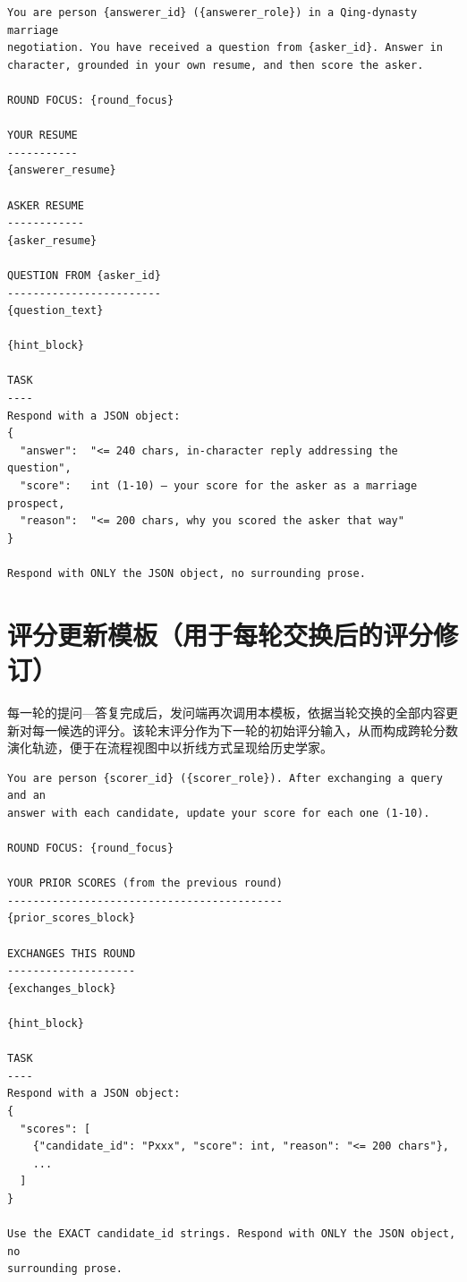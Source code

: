 \begingroup\footnotesize
\begin{verbatim}
You are person {answerer_id} ({answerer_role}) in a Qing-dynasty marriage
negotiation. You have received a question from {asker_id}. Answer in
character, grounded in your own resume, and then score the asker.

ROUND FOCUS: {round_focus}

YOUR RESUME
-----------
{answerer_resume}

ASKER RESUME
------------
{asker_resume}

QUESTION FROM {asker_id}
------------------------
{question_text}

{hint_block}

TASK
----
Respond with a JSON object:
{
  "answer":  "<= 240 chars, in-character reply addressing the question",
  "score":   int (1-10) — your score for the asker as a marriage prospect,
  "reason":  "<= 200 chars, why you scored the asker that way"
}

Respond with ONLY the JSON object, no surrounding prose.
\end{verbatim}
\endgroup

\section{评分更新模板（用于每轮交换后的评分修订）}\label{sec:appendix-score}

每一轮的提问—答复完成后，发问端再次调用本模板，依据当轮交换的全部内容更新对每一候选的评分。该轮末评分作为下一轮的初始评分输入，从而构成跨轮分数演化轨迹，便于在流程视图中以折线方式呈现给历史学家。

\begingroup\footnotesize
\begin{verbatim}
You are person {scorer_id} ({scorer_role}). After exchanging a query and an
answer with each candidate, update your score for each one (1-10).

ROUND FOCUS: {round_focus}

YOUR PRIOR SCORES (from the previous round)
-------------------------------------------
{prior_scores_block}

EXCHANGES THIS ROUND
--------------------
{exchanges_block}

{hint_block}

TASK
----
Respond with a JSON object:
{
  "scores": [
    {"candidate_id": "Pxxx", "score": int, "reason": "<= 200 chars"},
    ...
  ]
}

Use the EXACT candidate_id strings. Respond with ONLY the JSON object, no
surrounding prose.
\end{verbatim}
\endgroup

